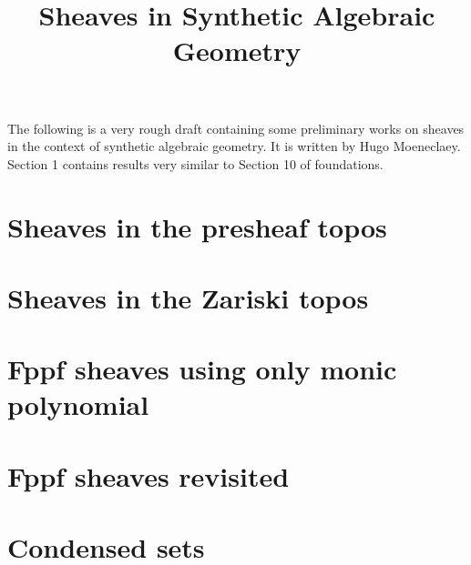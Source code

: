 \documentclass{../util/zariski}
\title{Sheaves in Synthetic Algebraic Geometry}
\begin{document}
\maketitle

The following is a very rough draft containing some preliminary works on sheaves in the context of synthetic algebraic geometry. It is written by Hugo Moeneclaey. Section 1 contains results very similar to Section 10 of foundations.

\tableofcontents

\section{Sheaves in the presheaf topos}


\section{Sheaves in the Zariski topos}


\section{Fppf sheaves using only monic polynomial}


\section{Fppf sheaves revisited}


\section{Condensed sets}




\printindex

\printbibliography
\end{document}
